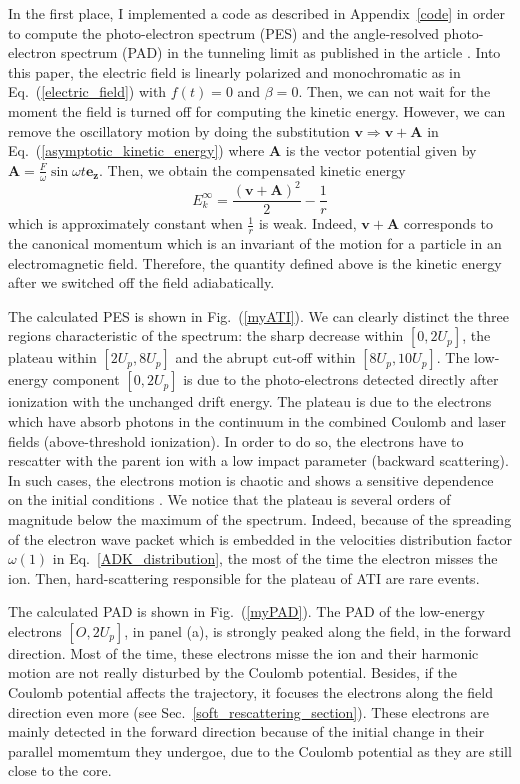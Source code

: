 \documentclass[a4paper]{article}
\begin{document}
In the first place, I implemented a code as described in Appendix~\ref{code} in order to compute the photo-electron spectrum (PES) and the angle-resolved photo-electron spectrum (PAD) in the tunneling limit as published in the article \cite{Hu_1997}. Into this paper, the electric field is linearly polarized and monochromatic as in Eq.~(\ref{electric_field}) with $f(t)=0$ and $\beta=0$. Then, we can not wait for the moment the field is turned off for computing the kinetic energy. However, we can remove the oscillatory motion by doing the substitution $\mathbf{v}\Rightarrow\mathbf{v}+\mathbf{A}$ in Eq.~(\ref{asymptotic_kinetic_energy}) where $\mathbf{A}$ is the vector potential given by $\mathbf{A}=\tfrac{F}{\omega}\sin{\omega t}\mathbf{e_{z}}$. Then, we obtain the compensated kinetic energy
\begin{equation}
E_{k}^{\infty}=\frac{(\mathbf{v}+\mathbf{A})^{2}}{2}-\frac{1}{r}
\end{equation}
which is approximately constant when $\frac{1}{r}$ is weak. Indeed, $\mathbf{v}+\mathbf{A}$ corresponds to the canonical momentum which is an invariant of the motion for a particle in an electromagnetic field. Therefore, the quantity defined above is the kinetic energy after we switched off the field adiabatically.
\par 
The calculated PES is shown in Fig.~(\ref{myATI}). We can clearly distinct the three regions characteristic of the spectrum: the sharp decrease within $[0, 2U_{p}]$, the plateau within $[2U_{p}, 8U_{p}]$ and the abrupt cut-off within $[8U_{p}, 10U_{p}]$. The low-energy component $[0, 2U_{p}]$ is due to the photo-electrons detected directly after ionization with the unchanged drift energy. The plateau is due to the electrons which have absorb photons in the continuum in the combined Coulomb and laser fields (above-threshold ionization). In order to do so, the electrons have to rescatter with the parent ion with a low impact parameter (backward scattering). In such cases, the electrons motion is chaotic and shows a sensitive dependence on the initial conditions \cite{Hu_1997}. We notice that the plateau is several orders of magnitude below the maximum of the spectrum. Indeed, because of the spreading of the electron wave packet which is embedded in the velocities distribution factor $\omega(1)$ in Eq.~\ref{ADK_distribution}, the most of the time the electron misses the ion. Then, hard-scattering responsible for the plateau of ATI are rare events.
\par
The calculated PAD is shown in Fig.~(\ref{myPAD}). The PAD of the low-energy electrons $[O, 2U_{p}]$, in panel (a), is strongly peaked along the field, in the forward direction. Most of the time, these electrons misse the ion and their harmonic motion are not really disturbed by the Coulomb potential. Besides, if the Coulomb potential affects the trajectory, it focuses the electrons along the field direction even more (see Sec.~\ref{soft_rescattering_section}). These electrons are mainly detected in the forward direction because of the initial change in their parallel momemtum they undergoe, due to the Coulomb potential as they are still close to the core. \\
\end{document}
